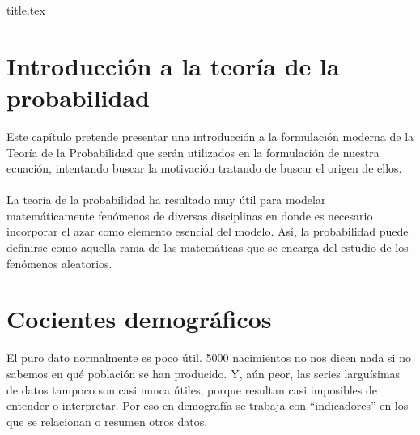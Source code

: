 \documentclass[a4paper,11pt]{book}
\begin{document}
\frontmatter
{title.tex}

\clearpage
\thispagestyle{empty}

\tableofcontents

\mainmatter
\chapter{Introducción a la teoría de la probabilidad}
    Este capítulo pretende presentar una introducción a la formulación moderna de la Teoría de la Probabilidad que serán utilizados en la formulación de nuestra ecuación, intentando buscar la motivación tratando de buscar el origen de ellos.\\\\
    La teoría de la probabilidad ha resultado muy útil para modelar
    matemáticamente fenómenos de diversas disciplinas en donde es necesario incorporar el azar como elemento esencial del modelo. Así, la probabilidad puede definirse como
    aquella rama de las matemáticas que se encarga del estudio de los fenómenos
    aleatorios.
    
    
    
    
    
    

\chapter{Cocientes demográficos}
    El puro dato normalmente es poco útil. 5000 nacimientos no nos dicen nada si no sabemos en qué población se han producido. Y, aún peor, las series larguísimas de datos tampoco son casi nunca útiles, porque resultan casi imposibles de entender o interpretar. Por eso en demografía se trabaja con “indicadores” en los que se relacionan o resumen otros datos.
    
    
\end{document}
